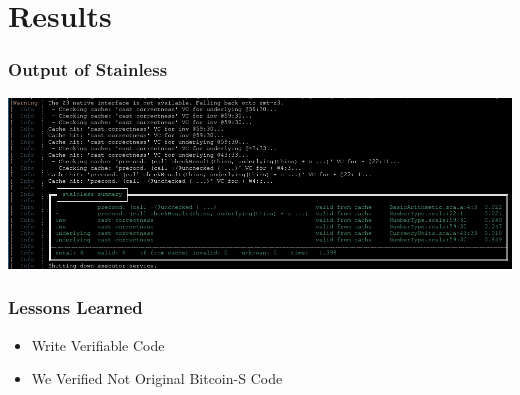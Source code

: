 \documentclass{beamer}
\begin{document}
\section{Results}

\begin{frame}
\frametitle{Output of Stainless}
\centering
\includegraphics[width=\textwidth,height=0.8\textheight,keepaspectratio]{assets/final_verify_output.png}
\end{frame}

\begin{frame}
\frametitle{Lessons Learned}
\begin{itemize}
  \item Write Verifiable Code
  \item We Verified Not Original Bitcoin-S Code
\end{itemize}
\end{frame}
\end{document}
